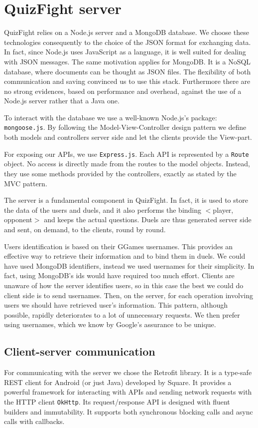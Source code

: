 \section{QuizFight server}\label{sec:server}

QuizFight relies on a Node.js server and a MongoDB database.
We choose these technologies consequently to the choice of the JSON format for
exchanging data.
In fact, since Node.js uses JavaScript as a language, it is well suited for
dealing with JSON messages.
The same motivation applies for MongoDB. It is a NoSQL database, where
documents can be thought as JSON files.
The flexibility of both communication and saving convinced us to use this
stack.
Furthermore there are no strong evidences, based on performance and overhead,
against the use of a Node.js server rather that a Java one. 

To interact with the database we use a well-known Node.js's package:
\texttt{mongoose.js}.
By following the Model-View-Controller design pattern we define both
models and controllers server side and let the clients provide the View-part.

For exposing our APIs, we use \texttt{Express.js}.
Each API is represented by a \texttt{Route} object.
No access is directly made from the routes to the model objects.
Instead, they use some methods provided by the controllers, exactly as stated
by the MVC pattern.

The server is a fundamental component in QuizFight. In fact, it is used to
store the data of the users and duels, and it also performs the binding
$<$player, opponent$>$ and keeps the actual questions.
Duels are thus generated server side and sent, on demand, to the clients,
round by round.

Users identification is based on their GGames usernames.
This provides an effective way to retrieve their information and to bind
them in duels.
We could have used MongoDB identifiers, instead we used usernames for their
simplicity.
In fact, using MongoDB's ids would have required too much effort.
Clients are unaware of how the server identifies users, so in this case the
best we could do client side is to send usernames.
Then, on the server, for each operation involving users we should have
retrieved user's information.
This pattern, although possible, rapidly deteriorates to a lot of unnecessary
requests.
We then prefer using usernames, which we know by Google's assurance to be
unique.

\subsection{Client-server communication}
For communicating with the server we chose the Retrofit library. It is a 
type-safe REST client for Android (or just Java) developed by Square. 
It provides a powerful framework for interacting with APIs and sending 
network requests with the HTTP client \texttt{OkHttp}. Its request/response
API is designed with fluent builders and immutability. It supports both 
synchronous blocking calls and async calls with callbacks. 

